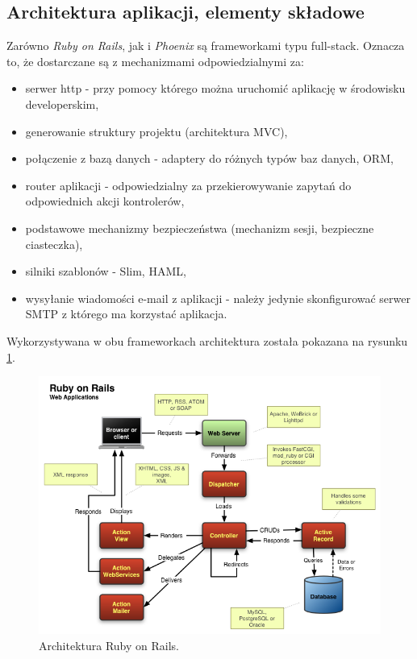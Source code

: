 \subsection{Architektura aplikacji, elementy składowe}
Zarówno \textit{Ruby on Rails}, jak i \textit{Phoenix} są frameworkami typu full-stack. Oznacza to, że dostarczane są z mechanizmami odpowiedzialnymi za:
\begin{itemize}
  \item serwer http - przy pomocy którego można uruchomić aplikację w środowisku developerskim,
  \item generowanie struktury projektu (architektura MVC),
  \item połączenie z bazą danych - adaptery do różnych typów baz danych, ORM,
  \item router aplikacji - odpowiedzialny za przekierowywanie zapytań do odpowiednich akcji kontrolerów,
  \item podstawowe mechanizmy bezpieczeństwa (mechanizm sesji, bezpieczne ciasteczka),
  \item silniki szablonów - Slim, HAML,
  \item wysyłanie wiadomości e-mail z aplikacji - należy jedynie skonfigurować serwer SMTP z którego ma korzystać aplikacja.
\end{itemize}

Wykorzystywana w obu frameworkach architektura została pokazana na rysunku \ref{fig:rails_architecture}.
\newpage
\begin{figure}[h]
  \centering
  \includegraphics[width=\linewidth]{images/rails_architecture}
  \caption{Architektura Ruby on Rails.}
  \label{fig:rails_architecture}
\end{figure}

